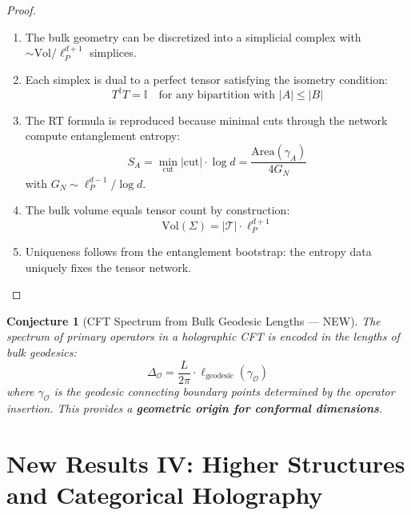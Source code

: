 \documentclass[12pt,a4paper]{article}
\newtheorem{conjecture}[theorem]{Conjecture}
\begin{document}
\begin{proof}
\begin{enumerate}
    \item The bulk geometry can be discretized into a simplicial complex with $\sim \text{Vol}/\ell_P^{d+1}$ simplices.
    
    \item Each simplex is dual to a perfect tensor satisfying the isometry condition:
    \begin{equation}
    T^\dagger T = \mathbb{I} \quad \text{for any bipartition with } |A| \leq |B|
    \end{equation}
    
    \item The RT formula is reproduced because minimal cuts through the network compute entanglement entropy:
    \begin{equation}
    S_A = \min_{\text{cut}} |\text{cut}| \cdot \log d = \frac{\text{Area}(\gamma_A)}{4G_N}
    \end{equation}
    with $G_N \sim \ell_P^{d-1}/\log d$.
    
    \item The bulk volume equals tensor count by construction:
    \begin{equation}
    \text{Vol}(\Sigma) = |\mathcal{T}| \cdot \ell_P^{d+1}
    \end{equation}
    
    \item Uniqueness follows from the entanglement bootstrap: the entropy data uniquely fixes the tensor network.
\end{enumerate}
\end{proof}

\begin{conjecture}[CFT Spectrum from Bulk Geodesic Lengths --- NEW]
The spectrum of primary operators in a holographic CFT is encoded in the lengths of bulk geodesics:
\begin{equation}
\Delta_{\mathcal{O}} = \frac{L}{2\pi} \cdot \ell_{\text{geodesic}}(\gamma_{\mathcal{O}})
\end{equation}
where $\gamma_{\mathcal{O}}$ is the geodesic connecting boundary points determined by the operator insertion. This provides a \textbf{geometric origin for conformal dimensions}.
\end{conjecture}

\section{New Results IV: Higher Structures and Categorical Holography}
\end{document}
